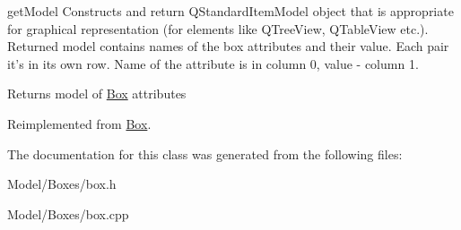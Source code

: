 get\-Model Constructs and return Q\-Standard\-Item\-Model object that is appropriate for graphical representation (for elements like Q\-Tree\-View, Q\-Table\-View etc.). Returned model contains names of the box attributes and their value. Each pair it's in its own row. Name of the attribute is in column 0, value -\/ column 1. 

\begin{DoxyReturn}{Returns}
model of \hyperlink{class_box}{Box} attributes 
\end{DoxyReturn}


Reimplemented from \hyperlink{class_box_a5c7911f3c88eec77383c0a464979807d}{Box}.



The documentation for this class was generated from the following files\-:\begin{DoxyCompactItemize}
\item 
Model/\-Boxes/box.\-h\item 
Model/\-Boxes/box.\-cpp\end{DoxyCompactItemize}
